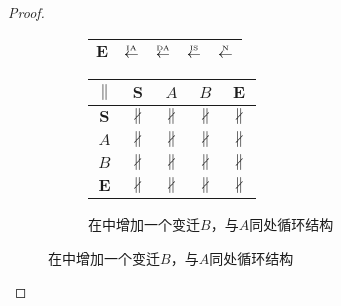 \begin{proof}
\begin{figure}[htbp]
\begin{subfigure}{1\textwidth}
\begin{minipage}[b]{0.3\textwidth}
\begin{tabular}{|c|c|c|c|c|}
        $\bm{E}$ & $\overset{\text{\tiny{IA}}}{\leftarrow}$ & $\overset{\text{\tiny{DA}}}{\leftarrow}$ & $\overset{\text{\tiny{IS}}}{\leftarrow}$ & $\overset{\text{\tiny{N}}}{\leftarrow}$\\ \hline
      \end{tabular}
    \end{minipage}
    \begin{minipage}[b]{0.3\textwidth}
      \vspace{1em}
      \centering
      \begin{tabular}{|c|c|c|c|c|} \hline
        $\parallel$ & $\bm{S}$ & $A$ & $B$ & $\bm{E}$\\ \hline
        $\bm{S}$ & $\nparallel$ & $\nparallel$ & $\nparallel$ & $\nparallel$\\ \hline
        $A$ & $\nparallel$ & $\nparallel$ & $\nparallel$ & $\nparallel$\\ \hline
        $B$ & $\nparallel$ & $\nparallel$ & $\nparallel$ & $\nparallel$\\ \hline
        $\bm{E}$ & $\nparallel$ & $\nparallel$ & $\nparallel$ & $\nparallel$\\ \hline
      \end{tabular}
    \end{minipage}
    \caption{在中增加一个变迁$B$，与$A$同处循环结构}
    \label{fig:uniqueness_2_e}
  \end{subfigure}


\end{figure}
\end{proof}
